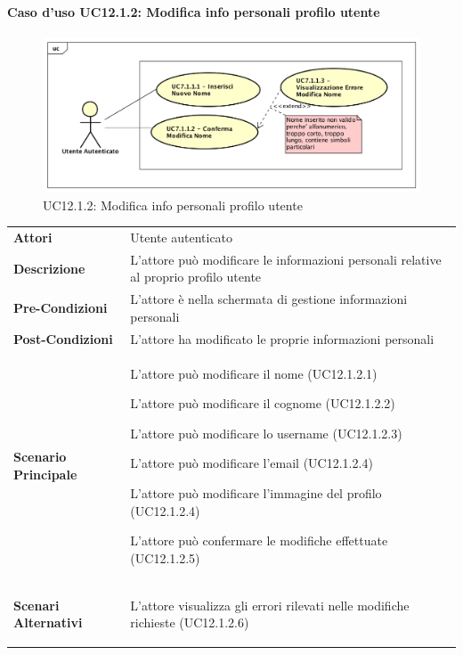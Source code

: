 \paragraph{Caso d'uso UC12.1.2: Modifica info personali profilo utente}
\label{UC12_1_2}
\begin{figure}[ht]
	\centering
	\includegraphics[scale=0.45]{UML/UC12_1_1.png}
	\caption{UC12.1.2: Modifica info personali profilo utente}
\end{figure}
\FloatBarrier
\begin{tabular}{ l | p{11cm}}
	\hline
	\rowcolor{Gray}
	\multicolumn{2}{c}{UC12.1.2 - Modifica info personali profilo utente} \\
	\hline
	\textbf{Attori} & Utente autenticato \\
	\textbf{Descrizione} & L'attore può modificare le informazioni personali relative al proprio profilo utente\\
	\textbf{Pre-Condizioni} & L'attore è nella schermata di gestione informazioni personali\\
	\textbf{Post-Condizioni} & L'attore ha modificato le proprie informazioni personali \\
	\textbf{Scenario Principale} & 
	\begin{enumerate*}[label=(\arabic*.),itemjoin={\newline}]
		\item L'attore può modificare il nome (UC12.1.2.1)
		\item L'attore può modificare il cognome (UC12.1.2.2)
		\item L'attore può modificare lo username (UC12.1.2.3)
		\item L'attore può modificare l'email (UC12.1.2.4)
		\item L'attore può modificare l'immagine del profilo (UC12.1.2.4)
		\item L'attore può confermare le modifiche effettuate (UC12.1.2.5)
	\end{enumerate*}\\
	\textbf{Scenari Alternativi} & 
	\begin{enumerate*}[label=(\arabic*.),itemjoin={\newline}]
		\item L'attore visualizza gli errori rilevati nelle modifiche richieste (UC12.1.2.6)
	\end{enumerate*}\\
\end{tabular}

